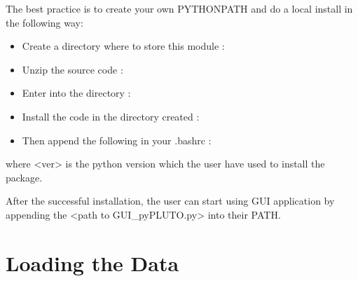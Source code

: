 \documentclass[letterpaper,10pt,english]{sphinxmanual}
\begin{document}
The best practice is to create your own PYTHONPATH and do a local install in the following way:
\begin{itemize}
\item {} 
Create a directory where to store this module : 

\item {} 
Unzip the source code : 

\item {} 
Enter into the directory : 

\item {} 
Install the code in the directory created : 

\item {} 
Then append the following in your .bashrc : 

\end{itemize}

where \textless{}ver\textgreater{} is the python version which the user have used to install the package.

After the successful installation, the user can start using GUI application by appending the \textless{}path to GUI\_pyPLUTO.py\textgreater{} into their PATH.


\section{Loading the Data}
\label{pload:loading-the-data}\label{pload::doc}
\end{document}
